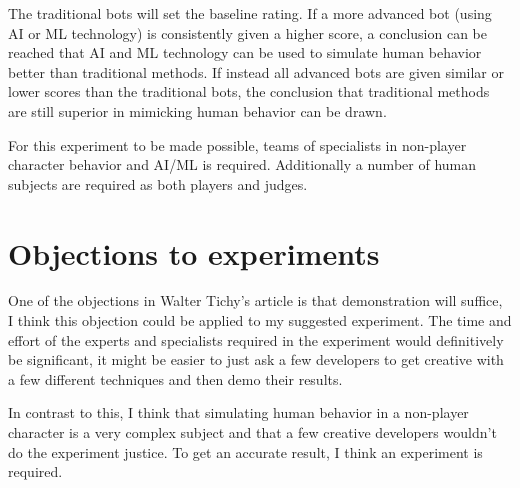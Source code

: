 \documentclass[11pt, a4paper]{article}
\begin{document}
The traditional bots will set the baseline rating. If a more advanced bot (using AI or ML technology) is
consistently given a higher score, a conclusion can be reached that AI and ML technology can be used
to simulate human behavior better than traditional methods. If instead all advanced bots are given similar
or lower scores than the traditional bots, the conclusion that traditional methods are still superior in 
mimicking human behavior can be drawn.

For this experiment to be made possible, teams of specialists in non-player character behavior and AI/ML
is required. Additionally a number of human subjects are required as both players and judges.

\section{Objections to experiments}
One of the objections in Walter Tichy's article \cite{walter} is that demonstration will suffice, I think
this objection could be applied to my suggested experiment. The time and effort of the experts and specialists
required in the experiment would definitively be significant, it might be easier to just ask a few developers
to get creative with a few different techniques and then demo their results.

In contrast to this, I think that simulating human behavior in a non-player character is a very complex subject
and that a few creative developers wouldn't do the experiment justice. To get an accurate result, I think an
experiment is required.



\end{document}
